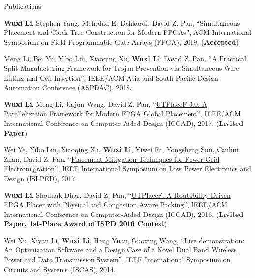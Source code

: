 \begin{rSection}{Publications}
\begin{description}[font=\normalfont]
\item[{[C6]}]{
    \textbf{Wuxi Li}, Stephen Yang, Mehrdad E. Dehkordi, David Z. Pan,
    ``Simultaneous Placement and Clock Tree Construction for Modern FPGAs'',
    ACM International Symposium on Field-Programmable Gate Arrays (FPGA), 2019.
    (\textbf{Accepted})
}

\item[{[C5]}]{
    Meng Li, Bei Yu, Yibo Lin, Xiaoqing Xu, \textbf{Wuxi Li}, David Z. Pan,
    ``A Practical Split Manufacturing Framework for Trojan Prevention via Simultaneous Wire Lifting and Cell Insertion'',
    IEEE/ACM Asia and South Pacific Design Automation Conference (ASPDAC), 2018.
}

\item[{[C4]}]{
    \textbf{Wuxi Li}, Meng Li, Jiajun Wang, David Z. Pan,
    ``\href{https://ieeexplore.ieee.org/abstract/document/8203879/}{UTPlaceF 3.0: A Parallelization Framework for Modern FPGA Global Placement}'',
    IEEE/ACM International Conference on Computer-Aided Design (ICCAD), 2017.
    (\textbf{Invited Paper})
}

\item[{[C3]}]{
    Wei Ye, Yibo Lin, Xiaoqing Xu, \textbf{Wuxi Li}, Yiwei Fu, Yongsheng Sun, Canhui Zhan, David Z. Pan,
    ``\href{http://ieeexplore.ieee.org/document/8009178/}{Placement Mitigation Techniques for Power Grid Electromigration}'',
    IEEE International Symposium on Low Power Electronics and Design (ISLPED), 2017.
}

\item[{[C2]}]{
    \textbf{Wuxi Li}, Shounak Dhar, David Z. Pan,
    ``\href{http://ieeexplore.ieee.org/document/7827643/}{UTPlaceF: A Routability-Driven FPGA Placer with Physical and Congestion Aware Packing}'',
    IEEE/ACM International Conference on Computer-Aided Design (ICCAD), 2016.
    (\textbf{Invited Paper, 1st-Place Award of ISPD 2016 Contest})
}

\item[{[C1]}]{
    Wei Xu, Xiyan Li, \textbf{Wuxi Li}, Hang Yuan, Guoxing Wang,
    ``\href{http://ieeexplore.ieee.org/document/6865159/}{Live demonstration: An Optimization Software and a Design Case of a Novel Dual Band Wireless Power and Data Transmission System}'',
    IEEE International Symposium on Circuits and Systems (ISCAS), 2014.
}

\end{description}

\end{rSection}
